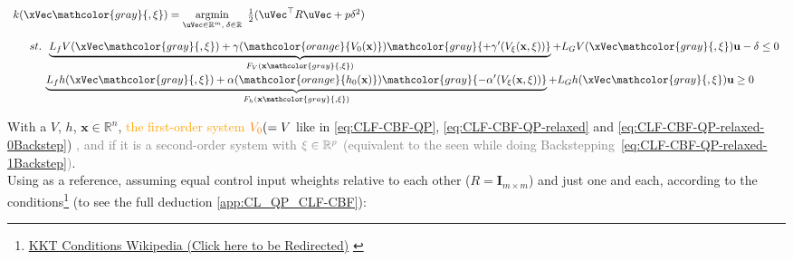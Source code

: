 \begin{equation}
    \begin{array}{l}
        k(\xVec \mathcolor{gray}{, \mathbf{\xi}}) = \underset{\uVec \in \mathbb{R}^m, \hspace{0.2em} \delta \in \mathbb{R}}{\mathrm{argmin}} \quad \hspace{-0.5em} \frac{1}{2} (\uVec^\top R \uVec + p\delta^2 ) \vspace{1em} \\ 
        \quad \hspace{0.5em}  st. \hspace{0.5em} \underbrace{L_fV(\xVec \mathcolor{gray}{, \mathbf{\xi}}) + \gamma(\mathcolor{orange}{V_0(\mathbf{x})}) \mathcolor{gray}{+ \gamma'(V_{\mathbf{\xi}}(\mathbf{x}, \mathbf{\xi}))}}_{F_V(\mathbf{x} \mathcolor{gray}{, \mathbf{\xi}})} + L_GV(\xVec \mathcolor{gray}{, \mathbf{\xi}})\mathbf{u} - \delta \leq  0 \vspace{0.25em}\\
        \quad \quad \hspace{1em}                 \underbrace{L_fh(\xVec \mathcolor{gray}{, \mathbf{\xi}}) + \alpha(\mathcolor{orange}{h_0(\mathbf{x})}) \mathcolor{gray}{- \alpha'(V_{\mathbf{\xi}}(\mathbf{x}, \mathbf{\xi}))}}_{F_h(\mathbf{x} \mathcolor{gray}{, \mathbf{\xi}})} + L_Gh(\xVec \mathcolor{gray}{, \mathbf{\xi}})\mathbf{u} \geq 0 
    \end{array}
 \label{eq:CLF-CBF-QP-relaxed-generic}
\end{equation}

With a  \(V\),  \(h\), \(\mathbf{x}\in\mathbb{R}^n\), \textcolor{orange}{the first-order system } \(\mathcolor{orange}{V_0} ( = V\) like in \ref{eq:CLF-CBF-QP}, \ref{eq:CLF-CBF-QP-relaxed} and \ref{eq:CLF-CBF-QP-relaxed-0Backstep}) \textcolor{gray}{, and if it is a second-order system with} \(\mathcolor{gray}{\mathbf{\xi}\in\mathbb{R}^p}\) \textcolor{gray}{(equivalent to the  seen while doing Backstepping~\ref{eq:CLF-CBF-QP-relaxed-1Backstep})}. \\


Using \cite{matias2025hybrid} as a reference, assuming equal control input wheights relative to each other (\(R = \mathbf{I}_{m \times m}\)) and just one  and  each, according to the  conditions\footnote{\href{https://en.wikipedia.org/wiki/Karush-Kuhn-Tucker_conditions}{KKT Conditions Wikipedia (Click here to be Redirected)} \label{foot: KKT_Conditions}} (to see the full deduction \ref{app:CL_QP_CLF-CBF}):

